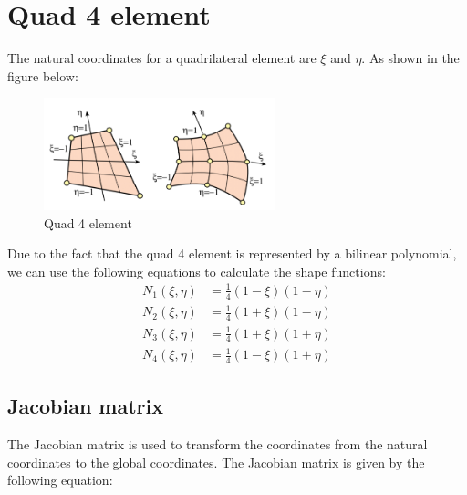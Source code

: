 \documentclass{article}  %
\begin{document}
\section{Quad 4 element}
The natural coordinates for a quadrilateral element are $\xi$ and $\eta$. As shown in the figure below:
\begin{figure}[h]
    \centering
    \includegraphics[width=0.6\textwidth]{Graphics/quad_4.PNG}
    \caption{Quad 4 element}
    \label{fig:quad_4_element}
\end{figure}

Due to the fact that the quad 4 element is represented by a bilinear polynomial, we can use the following equations to calculate the shape functions:
\begin{align}
  N_1(\xi,\eta) &= \frac{1}{4} (1-\xi)(1-\eta) \\
  N_2(\xi,\eta) &= \frac{1}{4} (1+\xi)(1-\eta) \\
  N_3(\xi,\eta) &= \frac{1}{4} (1+\xi)(1+\eta) \\
  N_4(\xi,\eta) &= \frac{1}{4} (1-\xi)(1+\eta)
\end{align}

\subsection{Jacobian matrix}
The Jacobian matrix is used to transform the coordinates from the natural coordinates to the global coordinates. The Jacobian matrix is given by the following equation:
\end{document}
